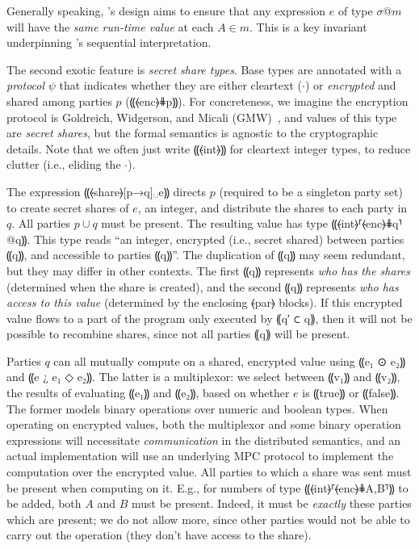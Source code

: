 Generally speaking, \mpc's design aims to ensure that any expression
$e$ of type $\sigma @ m$ will have the \emph{same run-time value} at
each $A \in m$. This is a key invariant underpinning \mpc's sequential
interpretation.

The second exotic feature is \emph{secret share types}.
Base types are annotated with a
\emph{protocol} $\psi$ that indicates whether they are either
cleartext ($\cdot$) or \emph{encrypted} and shared among parties
$p$ (⸨⦑enc⦒⋕p⸩). For concreteness, we imagine the encryption protocol is
Goldreich, Widgerson, and Micali (GMW)~\citeyear{STOC:GolMicWig87},
and values of this type are \emph{secret shares}, but the formal
semantics is agnostic to the cryptographic details. Note that we
often just write ⸨⦑int⦒⸩ for cleartext integer types, to reduce
clutter (i.e., eliding the $\cdot$).

The \mpc expression ⸨⦑share⦒[p→q]␣e⸩ directs $p$ (required to be a singleton party set) to
create secret shares of $e$, an integer, and distribute the shares to
each party in
$q$. All parties $p \cup q$ must be present. The resulting value
has type ⸨⦑int⦒⸢⦑enc⦒⋕q⸣@q⸩. This type reads “an integer, encrypted
(i.e., secret shared) between parties ⸨q⸩, and accessible to parties
⸨q⸩”. The duplication of ⸨q⸩ may seem redundant, but they may differ
in other contexts. The first ⸨q⸩ represents \emph{who has the
shares} (determined when the share is created), and the second ⸨q⸩
represents \emph{who has access to this value} (determined by the
enclosing ⦑par⦒ blocks). If this encrypted value flows to a part of
the program only executed by ⸨q′ ⊂ q⸩, then it will not be possible to
recombine shares, since not all parties ⸨q⸩ will be present.

Parties $q$ can all mutually compute on a shared, encrypted value
using ⸨e₁ ⊙ e₂⸩ and ⸨e ¿ e₁ ◇ e₂⸩. The latter is a
multiplexor: we select between ⸨v₁⸩ and ⸨v₂⸩, the results of evaluating ⸨e₁⸩ and ⸨e₂⸩,
based on whether $e$ is ⸨true⸩ or ⸨false⸩. The former models binary operations over numeric and boolean types.
When operating on encrypted values, both the multiplexor and some binary
operation expressions will necessitate \emph{communication} in the
distributed semantics, and an actual implementation will use an
underlying MPC protocol to implement the computation over the encrypted value.
All parties to which a share was sent must be present when computing on it. E.g., for numbers of type
⸨⦑int⦒⸢⦑enc⦒⋕{A,B}⸣⸩ to be added, both $A$ and $B$ must be
present. Indeed, it must be \emph{exactly} these parties which are
present; we do not allow more, since other parties would not be
able to carry out the operation (they don't have access to the
share).

